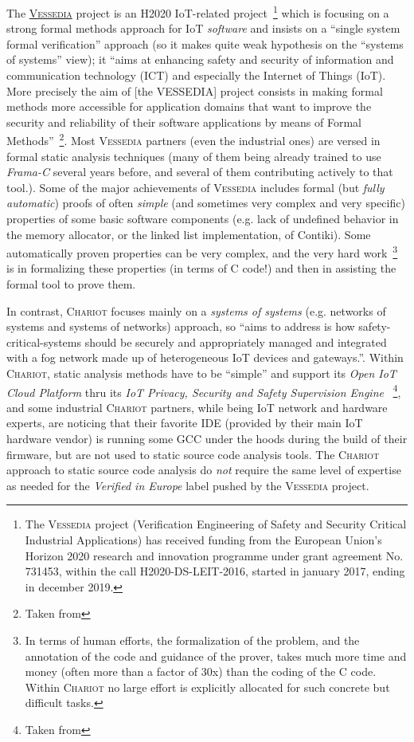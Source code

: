 The \href{http://vessedia.eu/}{\textsc{Vessedia}}  project is an H2020
IoT-related project~\footnote{The \textsc{Vessedia} project (Verification
  Engineering of Safety and Security Critical Industrial Applications)
  has received funding from the European Union's Horizon 2020 research
  and innovation programme under grant agreement No. 731453, within
  the call H2020-DS-LEIT-2016, started in january 2017, ending in
  december 2019.} which is focusing on a strong formal methods
approach for IoT \emph{software} and insists on a ``single system
formal verification'' approach (so it makes quite weak hypothesis on
the ``systems of systems'' view); it ``aims at enhancing safety and
security of information and communication technology (ICT) and
especially the Internet of Things (IoT). More precisely the aim of
[the VESSEDIA] project consists in making formal methods more
accessible for application domains that want to improve the security
and reliability of their software applications by means of Formal
Methods''~\footnote{Taken from
  }. Most \textsc{Vessedia} partners
(even the industrial ones) are versed in formal static analysis
techniques (many of them being already trained to use \emph{Frama-C}
several years before, and several of them contributing actively to
that tool.). Some of the major achievements of \textsc{Vessedia}
includes formal (but \emph{fully automatic}) proofs of often
\emph{simple} (and sometimes very complex and very specific)
properties of some basic software components (e.g. lack of undefined
behavior in the memory allocator, or the linked list implementation,
of Contiki). Some automatically proven properties can be very complex,
and the very hard work~\footnote{In terms of human efforts, the
  formalization of the problem, and the annotation of the code and
  guidance of the prover, takes much more time and money (often more
  than a factor of 30x) than the coding of the C code. Within
  \textsc{Chariot} no large effort is explicitly allocated for such
  concrete but difficult tasks.}  is in formalizing these properties
(in terms of C code!)  and then in assisting the formal tool to prove
them.


In contrast, \textsc{Chariot} focuses mainly on a \emph{systems of
  systems} (e.g. networks of systems and systems of networks)
approach, so ``aims to address is how safety-critical-systems should
be securely and appropriately managed and integrated with a fog
network made up of heterogeneous IoT devices and gateways.''. Within
\textsc{Chariot}, static analysis methods have to be ``simple'' and
support its \emph{Open IoT Cloud Platform} thru its \emph{IoT Privacy,
  Security and Safety Supervision Engine} ~\footnote{Taken
  from }, and some
industrial \textsc{Chariot} partners, while being IoT network and
hardware experts, are noticing that their favorite IDE (provided by
their main IoT hardware vendor) is running some GCC under the hoods
during the build of their firmware, but are not used to static source
code analysis tools. The \textsc{Chariot} approach to static source
code analysis do \emph{not} require the same level of expertise as needed for
the \emph{Verified in Europe} label pushed by the \textsc{Vessedia}
project.

